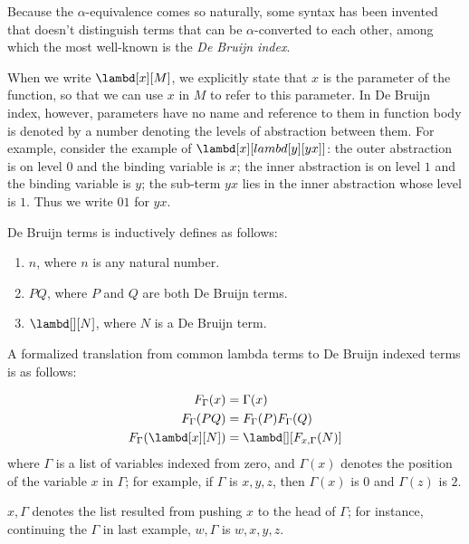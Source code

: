 \documentclass[../../../include/open-logic-section]{subfiles}
\begin{document}

Because the $\alpha$-equivalence comes so naturally, some syntax has
been invented that doesn't distinguish terms that can be
$\alpha$-converted to each other, among which the most well-known is the
\emph{De Bruijn index}.

When we write $\lambd[x][M]$, we explicitly state that $x$ is the
parameter of the function, so that we can use $x$ in $M$ to refer
to this parameter. In De Bruijn index, however, parameters have no
name and reference to them in function body is denoted by a number
denoting the levels of abstraction between them. For example, consider
the example of $\lambd[x][lambd[y][y x]]$: the outer  abstraction
is on level $0$ and the binding variable is $x$; the inner abstraction
is on level $1$ and the binding variable is $y$; the sub-term $y x$
lies in the inner abstraction whose level is $1$. Thus we
write $0 1$ for $y x$.

\begin{defn}
  De Bruijn terms is inductively defines as follows:
  \begin{enumerate}
  \item $n$, where $n$ is any natural number.
  \item $PQ$, where $P$ and $Q$ are both De Bruijn terms.
  \item $\lambd[][N]$, where $N$ is a De Bruijn term.
  \end{enumerate}
\end{defn}

A formalized translation from common lambda terms to De Bruijn indexed
terms is as follows:
\begin{defn}
  \begin{align*}
    F_\Gamma(x) &= \Gamma(x) \\
    F_\Gamma(PQ) &= F_\Gamma(P)F_\Gamma(Q) \\
    F_\Gamma(\lambd[x][N]) &= \lambd[][F_{x,\Gamma}(N)]
  \end{align*}
  where $\Gamma$ is a list of variables indexed from zero, and
  $\Gamma(x)$ denotes the position of the variable $x$ in $\Gamma$;
  for example, if $\Gamma$ is $x,y,z$, then $\Gamma(x)$ is $0$ and
  $\Gamma(z)$ is $2$.
  
  $x,\Gamma$ denotes the list resulted from pushing $x$ to the head of
  $\Gamma$; for instance, continuing the $\Gamma$ in last example,
  $w,\Gamma$ is $w,x,y,z$.
\end{defn}
\end{document}
